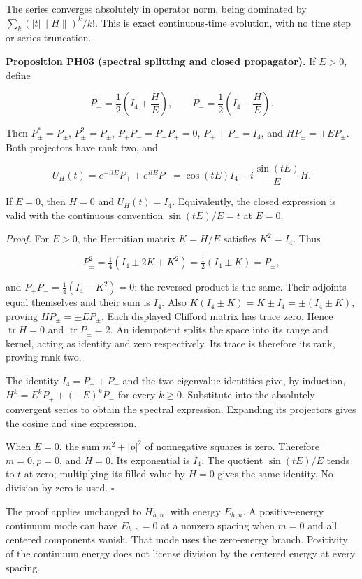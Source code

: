 The series converges absolutely in operator norm, being dominated by
\(\sum_k(|t|\|H\|)^k/k!\). This is exact continuous-time evolution, with
no time step or series truncation.

\textbf{Proposition PH03 (spectral splitting and closed propagator).} If
\(E>0\), define

\[
P_+=\frac12\left(I_4+\frac HE\right),\qquad
P_-=\frac12\left(I_4-\frac HE\right).
\]

Then \(P_\pm^*=P_\pm\), \(P_\pm^2=P_\pm\), \(P_+P_-=P_-P_+=0\),
\(P_++P_-=I_4\), and \(HP_\pm=\pm EP_\pm\). Both projectors have rank
two, and

\[
U_H(t)=e^{-itE}P_++e^{itE}P_-
=\cos(tE)I_4-i\frac{\sin(tE)}{E}H.
\]

If \(E=0\), then \(H=0\) and \(U_H(t)=I_4\). Equivalently, the closed
expression is valid with the continuous convention \(\sin(tE)/E=t\) at
\(E=0\).

\emph{Proof.} For \(E>0\), the Hermitian matrix \(K=H/E\) satisfies
\(K^2=I_4\). Thus

\[
P_\pm^2=\tfrac14(I_4\pm2K+K^2)=\tfrac12(I_4\pm K)=P_\pm,
\]

and \(P_+P_-=\tfrac14(I_4-K^2)=0\); the reversed product is the same.
Their adjoints equal themselves and their sum is \(I_4\). Also
\(K(I_4\pm K)=K\pm I_4=\pm(I_4\pm K)\), proving \(HP_\pm=\pm EP_\pm\).
Each displayed Clifford matrix has trace zero. Hence
\(\operatorname{tr}H=0\) and \(\operatorname{tr}P_\pm=2\). An idempotent
splits the space into its range and kernel, acting as identity and zero
respectively. Its trace is therefore its rank, proving rank two.

The identity \(I_4=P_++P_-\) and the two eigenvalue identities give, by
induction, \(H^k=E^kP_++(-E)^kP_-\) for every \(k\ge0\). Substitute into
the absolutely convergent series to obtain the spectral expression.
Expanding its projectors gives the cosine and sine expression.

When \(E=0\), the sum \(m^2+|p|^2\) of nonnegative squares is zero.
Therefore \(m=0,p=0\), and \(H=0\). Its exponential is \(I_4\). The
quotient \(\sin(tE)/E\) tends to \(t\) at zero; multiplying its filled
value by \(H=0\) gives the same identity. No division by zero is used.
\(\square\)

The proof applies unchanged to \(H_{h,n}\), with energy \(E_{h,n}\). A
positive-energy continuum mode can have \(E_{h,n}=0\) at a nonzero
spacing when \(m=0\) and all centered components vanish. That mode uses
the zero-energy branch. Positivity of the continuum energy does not
license division by the centered energy at every spacing.

